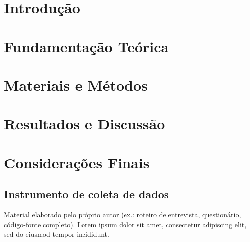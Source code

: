 \documentclass[mestrado,qualificacao]{packages/ppg}
\begin{document}


\textual

\chapter{Introdução}
\label{chp:introducao}


\chapter{Fundamentação Teórica}
\label{chp:fundamentacao-teorica}


\chapter{Materiais e Métodos}
\label{chp:materiais-metodos}


\chapter{Resultados e Discussão}
\label{chp:resultados}


\chapter{Considerações Finais}
\label{chp:consideracoes-finais}


\postextual

\printglossary
\printbibliography[title={REFERÊNCIAS}]

\begin{apendicesenv}
    \chapter{Instrumento de coleta de dados}
    \label{ape:questionario}
    Material elaborado pelo próprio autor (ex.: roteiro de entrevista,
    questionário, código-fonte completo). Lorem ipsum dolor sit amet,
    consectetur adipiscing elit, sed do eiusmod tempor incididunt.
\end{apendicesenv}
\end{document}
